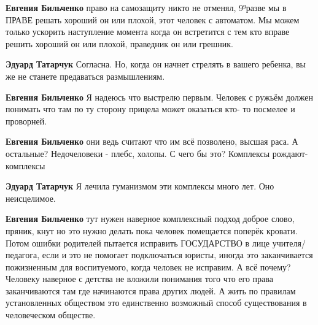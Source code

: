 \begin{itemize}
\begin{itemize}
\textbf{Евгения Бильченко} право на самозащиту никто не отменял, 9⁹разве мы в ПРАВЕ решать хороший он или плохой, этот человек с автоматом. Мы можем только ускорить наступление момента когда он встретится с тем кто вправе решить хороший он или плохой, праведник он или грешник.

 
\textbf{Эдуард Татарчук} Согласна. Но, когда он начнет стрелять в вашего ребенка, вы же не станете предаваться размышлениям.

 
\textbf{Евгения Бильченко} Я надеюсь что выстрелю первым. Человек с ружьём должен понимать что там по ту сторону прицела может оказаться кто- то посмелее и проворней.

 
\textbf{Евгения Бильченко} они ведь считают что им всё позволено, высшая раса. А остальные? Недочеловеки - плебс, холопы. С чего бы это?
Комплексы рождают- комплексы

 
\textbf{Эдуард Татарчук} Я лечила гуманизмом эти комплексы много лет. Оно неисцелимое.

 
\textbf{Евгения Бильченко} тут нужен наверное комплексный подход доброе слово,
пряник, кнут но это нужно делать пока человек помещается поперёк кровати. Потом
ошибки родителей пытается исправить ГОСУДАРСТВО в лице учителя/педагога, если и
это не помогает подключаться юристы, иногда это заканчивается пожизненным для
воспитуемого, когда человек не исправим. А всё почему? Человеку наверное с
детства не вложили понимания того что его права заканчиваются там где
начинаются права других людей. А жить по правилам установленных обществом это
единственно возможный способ существования в человеческом обществе.
\end{itemize}


\end{itemize}
